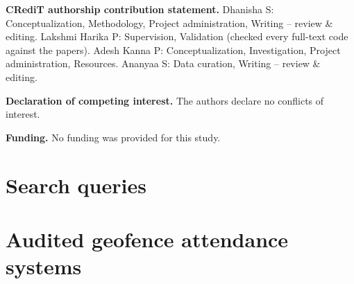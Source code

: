 \documentclass[preprint,12pt]{elsarticle}
\begin{document}
\noindent\textbf{CRediT authorship contribution statement.} Dhanisha S: Conceptualization, Methodology, Project administration, Writing -- review \& editing. Lakshmi Harika P: Supervision, Validation (checked every full-text code against the papers). Adesh Kanna P: Conceptualization, Investigation, Project administration, Resources. Ananyaa S: Data curation, Writing -- review \& editing.

\noindent\textbf{Declaration of competing interest.} The authors declare no conflicts of interest.

\noindent\textbf{Funding.} No funding was provided for this study.

\appendix
\section{Search queries}\label{app:queries}


\section{Audited geofence attendance systems}\label{app:audit}




\end{document}
